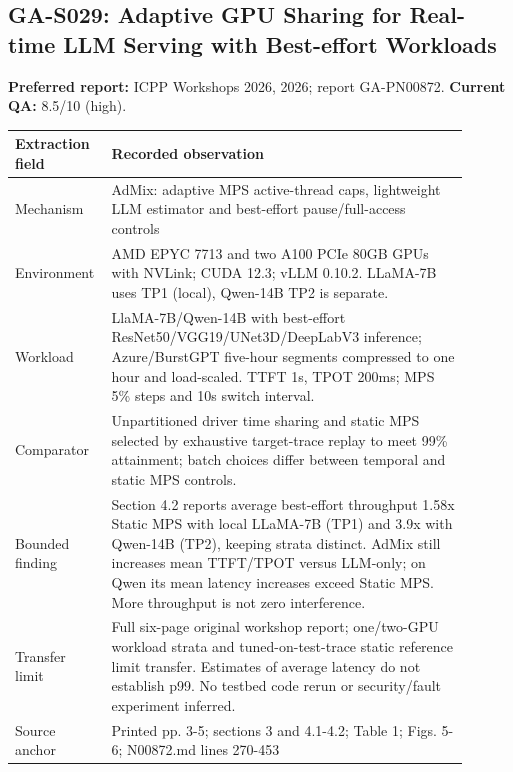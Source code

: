 \subsection{GA-S029: Adaptive GPU Sharing for Real-time LLM Serving with Best-effort Workloads}
\textbf{Preferred report:} ICPP Workshops 2026, 2026; report GA-PN00872. \textbf{Current QA:} 8.5/10 (high).
\begin{longtable}{P{0.15\linewidth}P{0.75\linewidth}}
\toprule Extraction field & Recorded observation\\\midrule\endhead
Mechanism & AdMix: adaptive MPS active-thread caps, lightweight LLM estimator and best-effort pause/full-access controls\\
Environment & AMD EPYC 7713 and two A100 PCIe 80GB GPUs with NVLink; CUDA 12.3; vLLM 0.10.2. LLaMA-7B uses TP1 (local), Qwen-14B TP2 is separate.\\
Workload & LlaMA-7B/Qwen-14B with best-effort ResNet50/VGG19/UNet3D/DeepLabV3 inference; Azure/BurstGPT five-hour segments compressed to one hour and load-scaled. TTFT 1s, TPOT 200ms; MPS 5\% steps and 10s switch interval.\\
Comparator & Unpartitioned driver time sharing and static MPS selected by exhaustive target-trace replay to meet 99\% attainment; batch choices differ between temporal and static MPS controls.\\
Bounded finding & Section 4.2 reports average best-effort throughput 1.58x Static MPS with local LLaMA-7B (TP1) and 3.9x with Qwen-14B (TP2), keeping strata distinct. AdMix still increases mean TTFT/TPOT versus LLM-only; on Qwen its mean latency increases exceed Static MPS. More throughput is not zero interference.\\
Transfer limit & Full six-page original workshop report; one/two-GPU workload strata and tuned-on-test-trace static reference limit transfer. Estimates of average latency do not establish p99. No testbed code rerun or security/fault experiment inferred.\\
Source anchor & Printed pp. 3-5; sections 3 and 4.1-4.2; Table 1; Figs. 5-6; N00872.md lines 270-453\\
\bottomrule\end{longtable}
